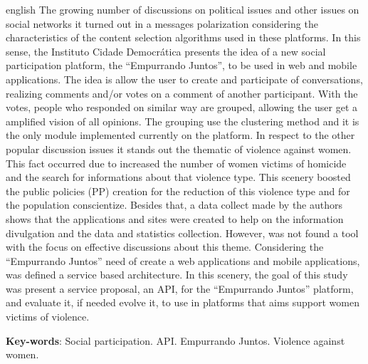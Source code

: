 \begin{resumo}[Abstract]
 \begin{otherlanguage*}{english}
  The growing number of discussions on political issues and other issues on social networks it turned out in a messages polarization considering the characteristics 
  of the content selection algorithms used in these platforms. In this sense, the Instituto Cidade Democrática presents the idea of a new social participation 
  platform, the ``Empurrando Juntos'', to be used in web and mobile applications. The idea is allow the user to create and participate of conversations, realizing 
  comments and/or votes on a comment of another participant. With the votes, people who responded on similar way are grouped, allowing the user get a amplified 
  vision of all opinions. The grouping use the clustering method and it is the only module implemented currently on the platform. In respect to the other popular 
  discussion issues it stands out the thematic of violence against women. This fact occurred due to increased the number of women victims of homicide and the search 
  for informations about that violence type. This scenery boosted the public policies (PP) creation for the reduction of this violence type and for the population 
  conscientize. Besides that, a data collect made by the authors shows that the applications and sites were created to help on the information divulgation and the 
  data and statistics collection. However, was not found a tool with the focus on effective discussions about this theme. Considering the “Empurrando Juntos” need of 
  create a web applications and mobile applications, was defined a service based architecture. In this scenery, the goal of this study was present a service 
  proposal, an API, for the ``Empurrando Juntos'' platform, and evaluate it, if needed evolve it, to use in platforms that aims support women victims of violence.


   \vspace{\onelineskip}
 
   \noindent 
   \textbf{Key-words}: Social participation. API. Empurrando Juntos. Violence against women.
 \end{otherlanguage*}
\end{resumo}
